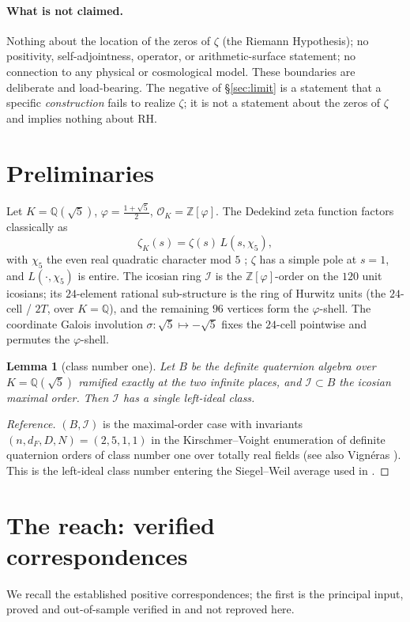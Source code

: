 \documentclass[11pt]{article}
\newtheorem{lemma}[theorem]{Lemma}
\theoremstyle{definition}
\newcommand{\Z}{\mathbb{Z}}
\newcommand{\Q}{\mathbb{Q}}
\newcommand{\zetaK}{\zeta_{K}}
\newcommand{\Icos}{\mathcal{I}}
\begin{document}
\paragraph{What is not claimed.}
Nothing about the location of the zeros of $\zeta$ (the Riemann Hypothesis); no
positivity, self-adjointness, operator, or arithmetic-surface statement; no connection
to any physical or cosmological model. These boundaries are deliberate and
load-bearing. The negative of \S\ref{sec:limit} is a statement that a specific
\emph{construction} fails to realize $\zeta$; it is not a statement about the zeros of
$\zeta$ and implies nothing about RH.

\section{Preliminaries}
Let $K=\Q(\sqrt5)$, $\varphi=\tfrac{1+\sqrt5}{2}$, $\mathcal{O}_K=\Z[\varphi]$. The
Dedekind zeta function factors classically as
\begin{equation}\label{eq:dedekind}
  \zetaK(s)=\zeta(s)\,L(s,\chi_5),
\end{equation}
with $\chi_5$ the even real quadratic character mod $5$ \cite{Neukirch}; $\zeta$ has a
simple pole at $s=1$, and $L(\cdot,\chi_5)$ is entire. The icosian ring $\Icos$ is the
$\Z[\varphi]$-order on the $120$ unit icosians; its $24$-element rational sub-structure
is the ring of Hurwitz units (the $24$-cell / $2T$, over $K=\Q$), and the remaining $96$
vertices form the $\varphi$-shell. The coordinate Galois involution
$\sigma:\sqrt5\mapsto-\sqrt5$ fixes the $24$-cell pointwise and permutes the $\varphi$-shell.

\begin{lemma}[class number one]\label{lem:h1}
Let $B$ be the definite quaternion algebra over $K=\Q(\sqrt5)$ ramified exactly at the
two infinite places, and $\Icos\subset B$ the icosian maximal order. Then $\Icos$ has a
single left-ideal class.
\end{lemma}
\begin{proof}[Reference]
$(B,\Icos)$ is the maximal-order case with invariants $(n,d_F,D,N)=(2,5,1,1)$ in the
Kirschmer--Voight enumeration of definite quaternion orders of class number one over
totally real fields \cite[Table 8.2]{KirschmerVoight} (see also Vign\'eras
\cite{Vigneras}). This is the left-ideal class number entering the Siegel--Weil average
used in \cite{IcosianTriad}.
\end{proof}

\section{The reach: verified correspondences}\label{sec:reach}
We recall the established positive correspondences; the first is the principal input,
proved and out-of-sample verified in \cite{IcosianTriad} and not reproved here.
\end{document}
